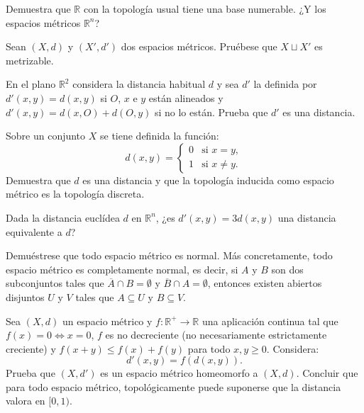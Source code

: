 \begin{ejer}[115]
Demuestra que $\mathbb{R}$ con la topología usual tiene una base numerable. ¿Y los espacios métricos $\mathbb{R}^n$?
\end{ejer}

\begin{ejer}[116]
Sean $(X, d)$ y $(X', d')$ dos espacios métricos. Pruébese que $X \sqcup X'$ es metrizable.
\end{ejer}

\begin{ejer}[117]
En el plano $\mathbb{R}^2$ considera la distancia habitual $d$ y sea $d'$ la definida por $d'(x,y) = d(x,y)$ si $O$, $x$ e $y$ están alineados y $d'(x,y) = d(x,O) + d(O,y)$ si no lo están. Prueba que $d'$ es una distancia.
\end{ejer}

\begin{ejer}[118]
Sobre un conjunto $X$ se tiene definida la función:
\[
    d(x,y) = \begin{cases} 0 & \text{si } x = y, \\ 1 & \text{si } x \neq y. \end{cases}
\]
Demuestra que $d$ es una distancia y que la topología inducida como espacio métrico es la topología discreta.
\end{ejer}

\begin{ejer}[119]
Dada la distancia euclídea $d$ en $\mathbb{R}^n$, ¿es $d'(x,y) = 3d(x,y)$ una distancia equivalente a $d$?
\end{ejer}

\begin{ejer}[120]
Demuéstrese que todo espacio métrico es normal. Más concretamente, todo espacio métrico es completamente normal, es decir, si $A$ y $B$ son dos subconjuntos tales que $\overline{A} \cap B = \emptyset$ y $\overline{B} \cap A = \emptyset$, entonces existen abiertos disjuntos $U$ y $V$ tales que $A \subseteq U$ y $B \subseteq V$.
\end{ejer}

\begin{ejer}[121]
Sea $(X, d)$ un espacio métrico y $f \colon \mathbb{R}^+ \to \mathbb{R}$ una aplicación continua tal que $f(x) = 0 \Leftrightarrow x = 0$, $f$ es no decreciente (no necesariamente estrictamente creciente) y $f(x + y) \le f(x) + f(y)$ para todo $x, y \ge 0$. Considera:
\[
    d'(x,y) = f(d(x,y)).
\]
Prueba que $(X, d')$ es un espacio métrico homeomorfo a $(X, d)$. Concluir que para todo espacio métrico, topológicamente puede suponerse que la distancia valora en $[0,1)$.
\end{ejer}

